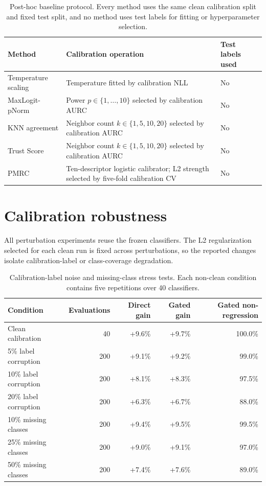 \documentclass[11pt,a4paper]{article}
\newcommand{\method}{PMRC}
\begin{document}
\begin{table}[H]
\centering
\caption{Post-hoc baseline protocol. Every method uses the same clean calibration split and fixed test split, and no method uses test labels for fitting or hyperparameter selection.}
\label{tab:baseline-protocol}
\small
\begin{tabularx}{\textwidth}{@{}lXl@{}}
\toprule
Method & Calibration operation & Test labels used \\
\midrule
Temperature scaling & Temperature fitted by calibration NLL & No \\
MaxLogit-pNorm & Power $p\in\{1,\ldots,10\}$ selected by calibration AURC & No \\
KNN agreement & Neighbor count $k\in\{1,5,10,20\}$ selected by calibration AURC & No \\
Trust Score & Neighbor count $k\in\{1,5,10,20\}$ selected by calibration AURC & No \\
\method{} & Ten-descriptor logistic calibrator; L2 strength selected by five-fold calibration CV & No \\
\bottomrule
\end{tabularx}
\end{table}

\section{Calibration robustness}

All perturbation experiments reuse the frozen classifiers. The L2 regularization selected for each clean run is fixed across perturbations, so the reported changes isolate calibration-label or class-coverage degradation.

\begin{table}[H]
\centering
\caption{Calibration-label noise and missing-class stress tests. Each non-clean condition contains five repetitions over 40 classifiers.}
\label{tab:calibration-robustness}
\small
\setlength{\tabcolsep}{4pt}
\begin{tabular}{@{}lrrrr@{}}
\toprule
Condition & Evaluations & Direct gain & Gated gain & Gated non-regression \\
\midrule
Clean calibration & 40 & +9.6\% & +9.7\% & 100.0\% \\
5\% label corruption & 200 & +9.1\% & +9.2\% & 99.0\% \\
10\% label corruption & 200 & +8.1\% & +8.3\% & 97.5\% \\
20\% label corruption & 200 & +6.3\% & +6.7\% & 88.0\% \\
10\% missing classes & 200 & +9.4\% & +9.5\% & 99.5\% \\
25\% missing classes & 200 & +9.0\% & +9.1\% & 97.0\% \\
50\% missing classes & 200 & +7.4\% & +7.6\% & 89.0\% \\
\bottomrule
\end{tabular}
\end{table}
\end{document}
